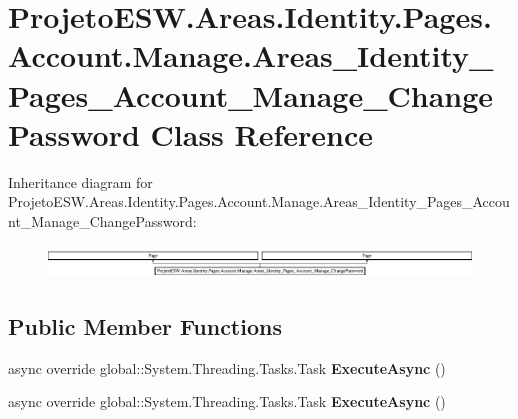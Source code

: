 \hypertarget{class_projeto_e_s_w_1_1_areas_1_1_identity_1_1_pages_1_1_account_1_1_manage_1_1_areas___identityf71e623a7e7907515cd465c2fe005b76}{}\section{Projeto\+E\+S\+W.\+Areas.\+Identity.\+Pages.\+Account.\+Manage.\+Areas\+\_\+\+Identity\+\_\+\+Pages\+\_\+\+Account\+\_\+\+Manage\+\_\+\+Change\+Password Class Reference}
\label{class_projeto_e_s_w_1_1_areas_1_1_identity_1_1_pages_1_1_account_1_1_manage_1_1_areas___identityf71e623a7e7907515cd465c2fe005b76}
Inheritance diagram for Projeto\+E\+S\+W.\+Areas.\+Identity.\+Pages.\+Account.\+Manage.\+Areas\+\_\+\+Identity\+\_\+\+Pages\+\_\+\+Account\+\_\+\+Manage\+\_\+\+Change\+Password\+:\begin{figure}[H]
\begin{center}
\leavevmode
\includegraphics[height=0.862866cm]{class_projeto_e_s_w_1_1_areas_1_1_identity_1_1_pages_1_1_account_1_1_manage_1_1_areas___identityf71e623a7e7907515cd465c2fe005b76}
\end{center}
\end{figure}
\subsection*{Public Member Functions}
\begin{DoxyCompactItemize}
\item 
\mbox{\label{class_projeto_e_s_w_1_1_areas_1_1_identity_1_1_pages_1_1_account_1_1_manage_1_1_areas___identityf71e623a7e7907515cd465c2fe005b76_abe37c54246a57ffa07c6380c7b5e375f}} 
async override global\+::\+System.\+Threading.\+Tasks.\+Task {\bfseries Execute\+Async} ()
\item 
\mbox{\label{class_projeto_e_s_w_1_1_areas_1_1_identity_1_1_pages_1_1_account_1_1_manage_1_1_areas___identityf71e623a7e7907515cd465c2fe005b76_abe37c54246a57ffa07c6380c7b5e375f}} 
async override global\+::\+System.\+Threading.\+Tasks.\+Task {\bfseries Execute\+Async} ()
\end{DoxyCompactItemize}
